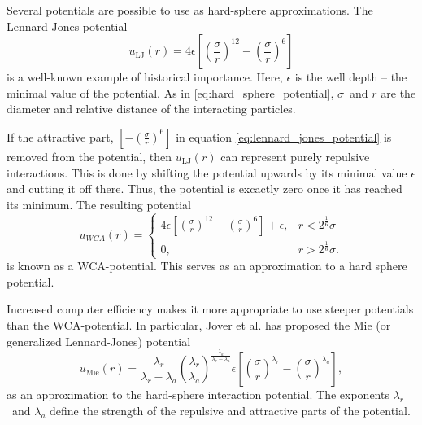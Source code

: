 Several potentials are possible to use as hard-sphere approximations.
The Lennard-Jones potential 
\begin{equation}
    \label{eq:lennard_jones_potential}
    u_{\text{LJ}}(r) = 
        4 \epsilon \left[
            \left(\frac{\sigma}{r}\right)^{12} -
            \left(\frac{\sigma}{r}\right)^{6}
        \right]
\end{equation}
is a well-known example of historical importance.
Here, $\epsilon$ is the well depth -- the minimal value of the potential.
As in \eqref{eq:hard_sphere_potential}, 
$\sigma$ and $r$ are the diameter and relative distance of the interacting particles.

If the attractive part, 
$\left[- \left(\frac{\sigma}{r}\right)^{6}\right]$
in equation \eqref{eq:lennard_jones_potential} is removed from the potential, 
then $u_{\text{LJ}}(r)$ 
can represent purely repulsive interactions. This is done 
by shifting the potential upwards by its minimal value 
$\epsilon$ and cutting it off there. Thus, the potential 
is excactly zero once it has reached its minimum. The 
resulting potential
\begin{equation}
    \label{eq:WCA_potential}
    u_{WCA}(r) = 
    \begin{cases}
        4 \epsilon \left[
            \left(\frac{\sigma}{r}\right)^{12} -
            \left(\frac{\sigma}{r}\right)^{6}
        \right]
        + \epsilon,
            & r < 2^\frac{1}{6} \sigma\\
        0,  & r > 2^\frac{1}{6}\sigma.
    \end{cases}
\end{equation}
is known as a WCA-potential.
This serves as an approximation to a hard sphere potential.

Increased computer efficiency makes it more appropriate to use 
steeper potentials than the WCA-potential.
In particular, Jover et al. \cite{ref:jover:pseudo_hard} 
has proposed the Mie (or generalized Lennard-Jones) potential
\begin{equation}
    u_{\text{Mie}}(r) = 
        \frac{\lambda_r}{\lambda_r - \lambda_a}
        \left(\frac{\lambda_r}{\lambda_a}\right)
        ^{\frac{\lambda_a}{\lambda_r - \lambda_a}}
        \epsilon \left[
            \left(\frac{\sigma}{r}\right)^{\lambda_r} -
            \left(\frac{\sigma}{r}\right)^{\lambda_a}
        \right],
\end{equation}
as an approximation to the hard-sphere interaction potential.
The exponents $\lambda_r$ and $\lambda_a$ define the strength of the 
repulsive and attractive parts of the potential.

